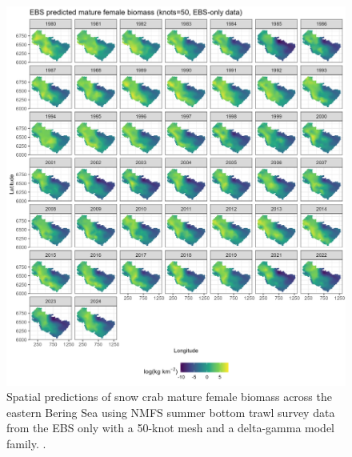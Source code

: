 \documentclass[
]{article}
\begin{document}
\begin{figure}

{\centering \includegraphics[width=1\linewidth,height=1\textheight]{../SNOW/Figures/EBS-50-DG-matfem_spatbio} 

}

\caption{Spatial predictions of snow crab mature female biomass across the eastern Bering Sea using NMFS summer bottom trawl survey data from the EBS only with a 50-knot mesh and a delta-gamma model family. .}\label{fig:snow-spatpred-bio-50-matfem-EBS}
\end{figure}
\end{document}
